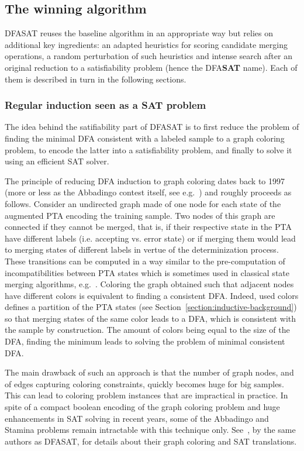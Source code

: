 \subsection{The winning algorithm\label{subsection:stamina-winning}}

DFASAT reuses the baseline algorithm in an appropriate way but relies on additional key ingredients: an adapted heuristics for scoring candidate merging operations, a random perturbation of such heuristics and intense search after an original reduction to a satisfiability problem (hence the DFA\textbf{SAT} name). Each of them is described in turn in the following sections.

\subsubsection*{Regular induction seen as a SAT problem}

The idea behind the satifiability part of DFASAT is to first reduce the problem of finding the minimal DFA consistent with a labeled sample to a graph coloring problem, to encode the latter into a satisfiability problem, and finally to solve it using an efficient SAT solver. 

The principle of reducing DFA induction to graph coloring dates back to 1997 (more or less as the Abbadingo contest itself, see e.g.~\cite{Coste:1997}) and roughly proceeds as follows. Consider an undirected graph made of one node for each state of the augmented PTA encoding the training sample. Two nodes of this graph are connected if they cannot be merged, that is, if their respective state in the PTA have different labels (i.e. accepting vs. error state) or if merging them would lead to merging states of different labels in vertue of the determinization process. These transitions can be computed in a way similar to the pre-computation of incompatibilities between PTA states which is sometimes used in classical state merging algorithms, e.g.~\cite{Coste:1998, Coste:2004}. Coloring the graph obtained such that adjacent nodes have different colors is equivalent to finding a consistent DFA. Indeed, used colors defines a partition of the PTA states (see Section~\ref{section:inductive-background}) so that merging states of the same color leads to a DFA, which is consistent with the sample by construction. The amount of colors being equal to the size of the DFA, finding the minimum leads to solving the problem of minimal consistent DFA.

The main drawback of such an approach is that the number of graph nodes, and of edges capturing coloring constraints, quickly becomes huge for big samples. This can lead to coloring problem instances that are impractical in practice. In spite of a compact boolean encoding of the graph coloring problem and huge enhancements in SAT solving in recent years, some of the Abbadingo and Stamina problems remain intractable with this technique only. See~\cite{Heule:2010}, by the same authors as DFASAT, for details about their graph coloring and SAT translations.

